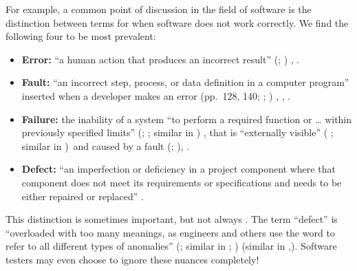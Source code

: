 \label{error-fault-failure}
For example, a common point of discussion in the field of software is the
distinction between terms for when software does not work correctly. We find
the following four to be most prevalent:
\begin{itemize}
    \item \textbf{Error:} ``a human action that produces an incorrect result''
          \ifnotpaper (\citealp[p.~128]{IEEE2010};
              \citealp[p.~399]{vanVliet2000})\else
              \cite[p.~128]{IEEE2010}, \cite[p.~399]{vanVliet2000}\fi.
    \item \textbf{Fault:} ``an incorrect step, process, or data definition in a
          computer program'' \citep[p.~140]{IEEE2010} inserted when a developer
          makes an error \ifnotpaper (pp.~128, 140; \citealp[p.~12\=/3]{SWEBOK2024};
              \citealp[pp.~399\==400]{vanVliet2000})\else
              \cite[pp.~128, 140]{IEEE2010}, \cite[pp.~399\==400]{vanVliet2000},
              \cite[p.~12\=/3]{SWEBOK2024}\fi.
    \item \textbf{Failure:} the inability of a system ``to perform a required
          function or \dots{} within previously specified limits'' \ifnotpaper
              (\citealp[p.~7]{IEEE2019a}; \citealp{ISO_IEC2005}; similar in \citealp[p.~400]{vanVliet2000})
          \else \cite[p.~7]{IEEE2019a}, \cite{ISO_IEC2005} \fi that is
          ``externally visible'' \ifnotpaper(\fi\citealp[p.~7]{IEEE2019a}%
          \ifnotpaper; similar in \citealp[p.~400]{vanVliet2000})\fi\
          and caused by a fault \ifnotpaper (\citealp[p.~12\=/3]{SWEBOK2024};
              \citealp[p.~400]{vanVliet2000})\else \cite[p.~400]{vanVliet2000},
              \cite[p.~12\=/3]{SWEBOK2024}\fi.
    \item \textbf{Defect:} ``an imperfection or deficiency in a project
          component where that component does not meet its requirements or
          specifications and needs to be either repaired or replaced''
          \citep[p.~96]{IEEE2010}.
\end{itemize}
This distinction is sometimes important, but not always
\citep[p.~4\=/3]{SWEBOK2014}. The term ``defect'' is
``overloaded with too many meanings, as engineers and others use the word to
refer to all different types of anomalies'' \ifnotpaper
    (\citealp[p.~12\=/3]{SWEBOK2025}; similar in \citealp[p.~124]{IEEE2017};
    \citeyear[p.~96]{IEEE2010}\todo{OG 2005})\else \cite[p.~12\=/3]{SWEBOK2025}
    (similar in \cite[p.~96]{IEEE2010},\cite[p.~124]{IEEE2017})\fi. Software testers
may even choose to ignore these nuances completely! \refHelper \bugPattonFlaw{}

